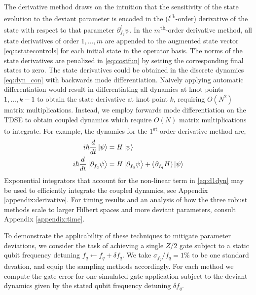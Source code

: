 The derivative method draws on the intuition that
the sensitivity of the state evolution to the deviant parameter
is encoded in the ($l$\textsuperscript{th}-order)
derivative of the state with respect to that parameter
$\partial_{f_{q}}^{l} \psi$. In the $m$\textsuperscript{th}-order
derivative method, all state derivatives of order $1, \dots, m$
are appended to the augmented state vector \eqref{eq:astatecontrols}
for each initial state in the operator basis. The norms of the state derivatives are penalized
in \eqref{eq:costfun} by setting the corresponding final states to zero.
The state derivatives could be obtained in the discrete dynamics \eqref{eq:dyn_con}
with backwards mode differentiation.
Naively applying automatic differentiation
would result in differentiating all dynamics at knot points
$1, \dots, k - 1$ to obtain the state derivative at knot point $k$, requiring
$O(N^{2})$ matrix multiplications. Instead, we 
employ forwards mode differentiation on the TDSE to obtain coupled dynamics
which require $O(N)$ matrix multiplications to integrate.
For example, the dynamics for the $1$\textsuperscript{st}-order derivative method are,
\begin{align}
  i \hbar \frac{d}{dt} \ket{\psi} &= H \ket{\psi}\\
  i \hbar \frac{d}{dt} \ket{\partial_{f_{q}}\psi} &=
  H \ket{\partial_{f_{q}} \psi} +
  (\partial_{f_{q}} H) \ket{\psi}
  \label{eq:d1dyn}
\end{align}
Exponential integrators that account for the non-linear
term in \eqref{eq:d1dyn} may be used to efficiently integrate the coupled dynamics,
see Appendix \ref{appendix:derivative}. For timing results
and an analysis of how the three robust methods scale to larger Hilbert spaces
and more deviant parameters,
consult Appendix \ref{appendix:time}.

To demonstrate the applicability of these techniques
to mitigate parameter deviations,
we consider the task of achieving a single $Z/2$
gate subject to a static qubit frequency detuning
$f_{q} \gets f_{q} + \delta f_{q}$.
We take $\sigma_{f_{q}} / f_{q} = 1\%$ to be one standard devation, and equip
the sampling methods accordingly. For each method we compute the gate error for
one simulated gate application subject to the deviant dynamics given by the
stated qubit frequency detuning $\delta f_{q}$.

